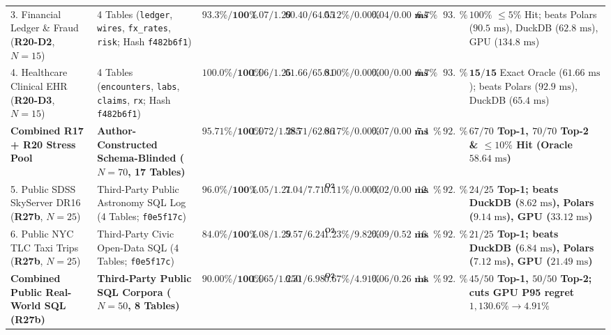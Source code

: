 \documentclass[10pt,a4paper]{article}
\newenvironment{fitasttable}{%
  \begin{lrbox}{\asttblbox}%
}{%
  \end{lrbox}%
  \sbox{\asttblboxB}{%
    \ifdim\wd\asttblbox>0.96\textwidth
      \resizebox{0.96\textwidth}{!}{\usebox{\asttblbox}}%
    \else
      \usebox{\asttblbox}%
    \fi
  }%
  \ifdim\ht\asttblboxB>0.72\textheight
    \resizebox{!}{0.72\textheight}{\usebox{\asttblboxB}}%
  \else
    \usebox{\asttblboxB}%
  \fi
}
\begin{document}
\begin{table}[!htbp]
\begin{fitasttable}
\begin{tabular}{@{}llcccccccl@{}}
3. Financial Ledger \& Fraud (\textbf{R20-D2}, $N=15$) & 4 Tables (\texttt{ledger}, \texttt{wires}, \texttt{fx\_rates}, \texttt{risk}; Hash \texttt{f482b6f1}) & $\mathbf{93.3\% / 100\%}$ & $\mathbf{1.07 / 1.29}$ & $\mathbf{60.40 / 64.55}$ & $\mathbf{0.12\% / 0.00\%}$ & $\mathbf{0.04 / 0.00\text{ ms}}$ & $6.7\%$ & $\mathbf{93.3\%}$ & $100\%$ $\le 5\%$ Hit; beats Polars ($90.5\text{ ms}$), DuckDB ($62.8\text{ ms}$), GPU ($134.8\text{ ms}$) \\
4. Healthcare Clinical EHR (\textbf{R20-D3}, $N=15$) & 4 Tables (\texttt{encounters}, \texttt{labs}, \texttt{claims}, \texttt{rx}; Hash \texttt{f482b6f1}) & $\mathbf{100.0\% / 100\%}$ & $\mathbf{1.06 / 1.25}$ & $\mathbf{61.66 / 65.81}$ & $\mathbf{0.00\% / 0.00\%}$ & $\mathbf{0.00 / 0.00\text{ ms}}$ & $6.7\%$ & $\mathbf{93.3\%}$ & $\mathbf{15/15}$ Exact Oracle ($61.66\text{ ms}$); beats Polars ($92.9\text{ ms}$), DuckDB ($65.4\text{ ms}$) \\
\textbf{Combined R17 + R20 Stress Pool} & \textbf{Author-Constructed Schema-Blinded ($N=70$, 17 Tables)} & $\mathbf{95.71\% / 100\%}$ & $\mathbf{1.072 / 1.285}$ & $\mathbf{58.71 / 62.86}$ & $\mathbf{0.17\% / 0.00\%}$ & $\mathbf{0.07 / 0.00\text{ ms}}$ & $\mathbf{7.14\%}$ & $\mathbf{92.9\%}$ & \textbf{$67/70$ Top-1, $70/70$ Top-2 \& $\le 10\%$ Hit (Oracle $58.64\text{ ms}$)} \\
5. Public SDSS SkyServer DR16 (\textbf{R27b}, $N=25$) & Third-Party Public Astronomy SQL Log (4 Tables; \texttt{f0e5f17c}) & $\mathbf{96.0\% / 100\%}$ & $\mathbf{1.05 / 1.21}$ & $\mathbf{7.04 / 7.71^{\text{O2}}}$ & $\mathbf{0.11\% / 0.00\%}$ & $\mathbf{0.02 / 0.00\text{ ms}}$ & $12.0\%$ & $\mathbf{92.0\%}$ & \textbf{$24/25$ Top-1; beats DuckDB ($8.62\text{ ms}$), Polars ($9.14\text{ ms}$), GPU ($33.12\text{ ms}$)} \\
6. Public NYC TLC Taxi Trips (\textbf{R27b}, $N=25$) & Third-Party Civic Open-Data SQL (4 Tables; \texttt{f0e5f17c}) & $\mathbf{84.0\% / 100\%}$ & $\mathbf{1.08 / 1.29}$ & $\mathbf{5.57 / 6.24^{\text{O2}}}$ & $\mathbf{1.23\% / 9.82\%}$ & $\mathbf{0.09 / 0.52\text{ ms}}$ & $16.0\%$ & $\mathbf{92.0\%}$ & \textbf{$21/25$ Top-1; beats DuckDB ($6.84\text{ ms}$), Polars ($7.12\text{ ms}$), GPU ($21.49\text{ ms}$)} \\
\textbf{Combined Public Real-World SQL (\textbf{R27b})} & \textbf{Third-Party Public SQL Corpora ($N=50$, 8 Tables)} & $\mathbf{90.00\% / 100\%}$ & $\mathbf{1.065 / 1.250}$ & $\mathbf{6.31 / 6.98^{\text{O2}}}$ & $\mathbf{0.67\% / 4.91\%}$ & $\mathbf{0.06 / 0.26\text{ ms}}$ & $\mathbf{14.0\%}$ & $\mathbf{92.0\%}$ & \textbf{$45/50$ Top-1, $50/50$ Top-2; cuts GPU P95 regret $1{,}130.6\%\rightarrow 4.91\%$} \\
\bottomrule
\end{tabular}
\end{fitasttable}%
\end{table}
\end{document}
